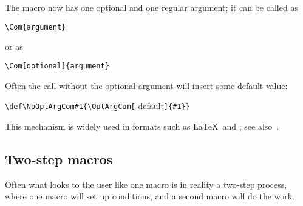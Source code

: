 The macro  now has one optional and one regular
argument; it can be called as 
\begin{verbatim}
\Com{argument}
\end{verbatim}
or as
\begin{verbatim}
\Com[optional]{argument}
\end{verbatim}
Often the call without the optional argument will insert some
default value:
\begin{disp}\verb>\def\NoOptArgCom#1{\OptArgCom[>%
{\italic default\/}\verb>]{#1}}>\end{disp}
This mechanism is widely used in formats such as \LaTeX\ and
\LamsTeX; see also~\cite{svb:future}.



\subsection{Two-step macros}

Often what looks to the user like one macro is in reality
a two-step process, where one macro will set up conditions,
and a second macro will do the work.

